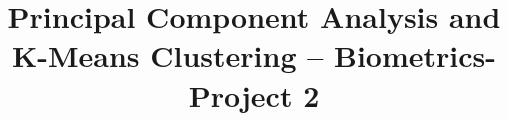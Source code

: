 \documentclass[conference]{IEEEtran}
\begin{document}
%
\title{Principal Component Analysis and K-Means Clustering –
Biometrics- Project 2}


\author{
}


% 








\maketitle
\end{document}
